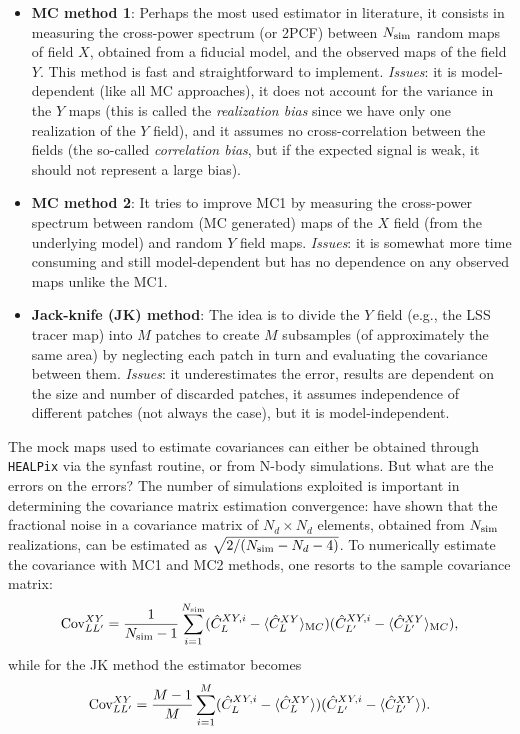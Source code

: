 \begin{itemize}
\item{\textbf{\gls{MC} method 1}: Perhaps the most used estimator in literature, it consists in measuring the cross-power spectrum (or \gls{2PCF}) between $N_{\text{sim}}$ random maps of field $X$, obtained from a fiducial model, and the observed maps of the field $Y$. This method is fast and straightforward to implement. \emph{Issues}: it is model-dependent (like all \gls{MC} approaches),  it does not account for the variance in the $Y$ maps (this is called the \emph{realization bias} since we have only one realization of the $Y$ field), and it assumes no cross-correlation between the fields (the so-called \emph{correlation bias}, but if the expected signal is weak, it should not represent a large bias).}
\item{\textbf{\gls{MC} method 2}: It tries to improve \gls{MC}1 by measuring the cross-power spectrum between random (\gls{MC} generated) maps of the $X$ field (from the underlying model) and random $Y$ field maps. \emph{Issues}: it is somewhat more time consuming and still model-dependent but has no dependence on any observed maps unlike the \gls{MC}1.}
\item{\textbf{Jack-knife (JK) method}: The idea is to divide the $Y$ field (e.g., the LSS tracer map) into $M$ patches to create $M$ subsamples (of approximately the same area) by neglecting each patch in turn and evaluating the covariance between them. \emph{Issues}: it underestimates the error, results are dependent on the size and number of discarded patches, it assumes independence of different patches (not always the case), but it is model-independent.}
\end{itemize}
The mock maps used to estimate covariances can either be obtained through \texttt{HEALPix} via the synfast routine, or from N-body simulations. But what are the errors on the errors? The number of simulations exploited is important in determining the covariance matrix estimation convergence: \citet{Taylor2013} have shown that the fractional noise in a covariance matrix of $N_d \times N_d$ elements, obtained from $N_{\text{sim}}$ realizations, can be estimated as $\sqrt{2/(N_{\text{sim}} - N_d - 4)}$.
To numerically estimate the covariance with \gls{MC}1 and \gls{MC}2 methods, one resorts to the sample covariance matrix:
%
\begin{equation}
\text{Cov}^{XY}_{LL'} = \frac{1}{N_{\text{sim}}-1} \sum_{i=1}^{N_{\text{sim}}} ( \hat{C}^{XY,i}_{L} - \langle \hat{C}^{XY}_{L}\rangle_{\mathrm MC})( \hat{C}^{XY,i}_{L'} - \langle \hat{C}^{XY}_{L'}\rangle_{\mathrm MC}),
\end{equation}
%
while for the JK method the estimator becomes
%
\begin{equation}
\text{Cov}^{XY}_{LL'} = \frac{M-1}{M} \sum_{i=1}^{M} ( \hat{C}^{XY,i}_{L} - \langle \hat{C}^{XY}_{L}\rangle)( \hat{C}^{XY,i}_{L'} - \langle \hat{C}^{XY}_{L'}\rangle).
\end{equation}
%

